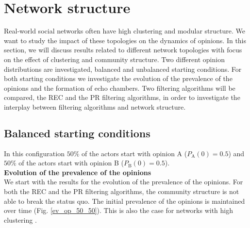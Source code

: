 \documentclass[11 pt , letterpaper , twoside , openright]{book}
\begin{document}
\section{Network structure}\label{netw_struc}

Real-world social networks often have high clustering and modular structure. We want to study the impact of these topologies on the dynamics of opinions. In this section, we will discuss results related to different network topologies with focus on the effect of clustering and community structure. Two different opinion distributions are investigated, balanced and unbalanced starting conditions. For both starting conditions we investigate the evolution of the prevalence of the opinions and the formation of echo chambers. Two filtering algorithms will be compared, the REC and the PR filtering algorithms, in order to investigate the interplay between filtering algorithms and network structure.

\subsection{Balanced starting conditions}
\label{50-50}

In this configuration $50 \%$ of the actors start with opinion A ($P_{\text{A}}(0) = 0.5$) and $50 \%$ of the actors start with opinion B ($P_{\text{B}}(0) = 0.5$).\\
\newline
\textbf{Evolution of the prevalence of the opinions}\\
\newline
We start with the results for the evolution of the prevalence of the opinions. For both the REC and the PR filtering algorithms, the community structure is not able to break the status quo. The initial prevalence of the opinions is maintained over time (Fig. \ref{ev_op_50_50}). This is also the case for networks with high clustering \cite{Perra2019}. 
\end{document}
